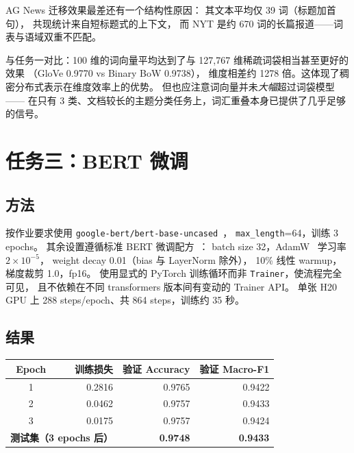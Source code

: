 \documentclass[10pt,twocolumn,letterpaper]{article}
\begin{document}
AG News 迁移效果最差还有一个结构性原因：
其文本平均仅 39 词（标题加首句），
共现统计来自短标题式的上下文，
而 NYT 是约 670 词的长篇报道——词表与语域双重不匹配。

与任务一对比：100 维的词向量平均达到了与 127{,}767 维稀疏词袋相当甚至更好的效果
（GloVe 0.9770 vs Binary BoW 0.9738），
维度相差约 1278 倍。这体现了稠密分布式表示在维度效率上的优势。
但也应注意词向量并未\emph{大幅}超过词袋模型——
在只有 3 类、文档较长的主题分类任务上，词汇重叠本身已提供了几乎足够的信号。

\section{任务三：BERT 微调}
\label{sec:task3}

\subsection{方法}

按作业要求使用 \texttt{google-bert/bert-base-uncased}~\cite{devlin2019bert}，
\texttt{max\_length}=64，训练 3 epochs。
其余设置遵循标准 BERT 微调配方~\cite{sun2019finetune}：
batch size 32，AdamW~\cite{loshchilov2019decoupled} 学习率 $2\times10^{-5}$，
weight decay 0.01（bias 与 LayerNorm 除外），
10\% 线性 warmup，梯度裁剪 1.0，fp16。
使用显式的 PyTorch 训练循环而非 \texttt{Trainer}，使流程完全可见，
且不依赖在不同 transformers 版本间有变动的 Trainer API。
单张 H20 GPU 上 288 steps/epoch、共 864 steps，训练约 35 秒。

\subsection{结果}

\begin{center}\small
\begin{tabular}{crrr}
\toprule
Epoch & 训练损失 & 验证 Accuracy & 验证 Macro-F1 \\
\midrule
1 & 0.2816 & 0.9765 & 0.9422 \\
2 & 0.0462 & 0.9757 & 0.9433 \\
3 & 0.0175 & 0.9757 & 0.9424 \\
\midrule
\multicolumn{2}{l}{\textbf{测试集（3 epochs 后）}}
  & \textbf{0.9748} & \textbf{0.9433} \\
\bottomrule
\end{tabular}
\end{center}
\end{document}
